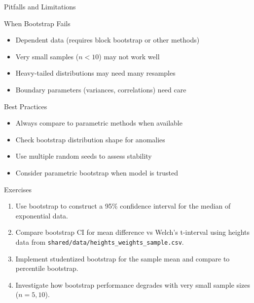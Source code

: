 \begin{frame}{Pitfalls and Limitations}
  \begin{block}{When Bootstrap Fails}
    \begin{itemize}
      \item Dependent data (requires block bootstrap or other methods)
      \item Very small samples ($n < 10$) may not work well
      \item Heavy-tailed distributions may need many resamples
      \item Boundary parameters (variances, correlations) need care
    \end{itemize}
  \end{block}

  \begin{block}{Best Practices}
    \begin{itemize}
      \item Always compare to parametric methods when available
      \item Check bootstrap distribution shape for anomalies
      \item Use multiple random seeds to assess stability
      \item Consider parametric bootstrap when model is trusted
    \end{itemize}
  \end{block}
\end{frame}

\begin{frame}{Exercises}
  \begin{enumerate}
    \item Use bootstrap to construct a 95\% confidence interval for the median of exponential data.
    \item Compare bootstrap CI for mean difference vs Welch's t-interval using heights data from \texttt{shared/data/heights\_weights\_sample.csv}.
    \item Implement studentized bootstrap for the sample mean and compare to percentile bootstrap.
    \item Investigate how bootstrap performance degrades with very small sample sizes ($n = 5, 10$).
  \end{enumerate}
\end{frame}


